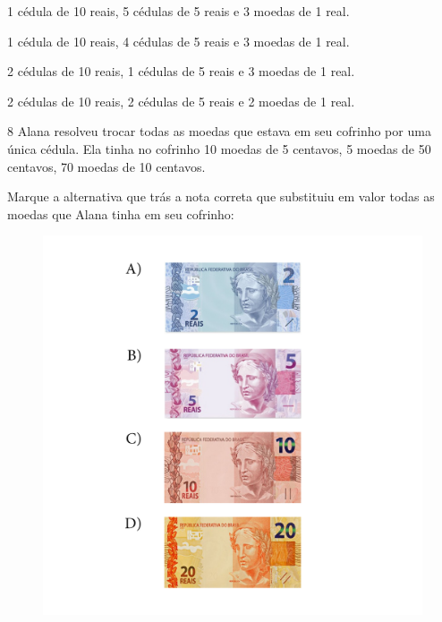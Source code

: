 \begin{escolha}
\item
  1 cédula de 10 reais, 5 cédulas de 5 reais e 3 moedas de 1 real.
\item
  1 cédula de 10 reais, 4 cédulas de 5 reais e 3 moedas de 1 real.
\item
  2 cédulas de 10 reais, 1 cédulas de 5 reais e 3 moedas de 1 real.
\item
  2 cédulas de 10 reais, 2 cédulas de 5 reais e 2 moedas de 1 real.
\end{escolha}


\num{8} Alana resolveu trocar todas as moedas que estava em seu cofrinho
por uma única cédula. Ela tinha no cofrinho 10 moedas de 5 centavos, 5
moedas de 50 centavos, 70 moedas de 10 centavos.

Marque a alternativa que trás a nota correta que substituiu em valor
todas as moedas que Alana tinha em seu cofrinho:

\begin{figure}[htpb!]
\includegraphics[width=\textwidth]{../ilustracoes/MAT5/SAEB_5ANO_MAT_figura126.png}
\end{figure}

